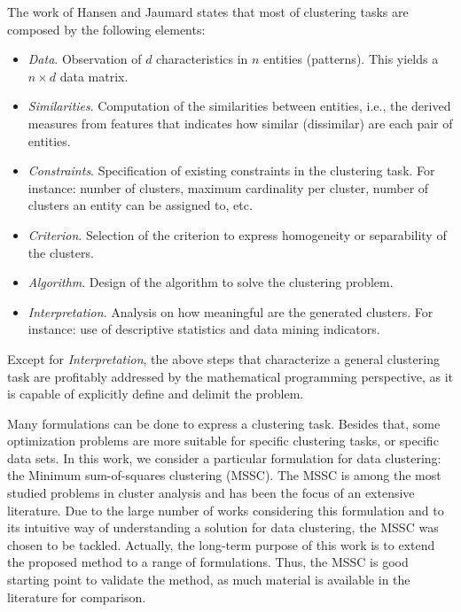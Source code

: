 The work of Hansen and Jaumard \cite{Hansen1997} states that most of clustering tasks are composed by the following elements:

\begin{itemize}

	\item \textit{Data}. Observation of $d$ characteristics in $n$ entities (patterns). This yields a $n \times d$ data matrix.

	\item \textit{Similarities}. Computation of the similarities between entities, i.e., the derived measures from features that indicates how similar (dissimilar) are each pair of entities.

	\item \textit{Constraints}. Specification of existing constraints in the clustering task. For instance: number of clusters, maximum cardinality per cluster, number of clusters an entity can be assigned to, etc.

	\item \textit{Criterion}. Selection of the criterion to express homogeneity or separability of the clusters.

	\item \textit{Algorithm}. Design of the algorithm to solve the clustering problem.

	\item \textit{Interpretation}. Analysis on how meaningful are the generated clusters. For instance: use of descriptive statistics and data mining indicators.

\end{itemize}

Except for \textit{Interpretation}, the above steps that characterize a general clustering task are profitably addressed by the mathematical programming perspective, as it is capable of explicitly define and delimit the problem.

Many formulations can be done to express a clustering task. Besides that, some optimization problems are more suitable for specific clustering tasks, or specific data sets. In this work, we consider a particular formulation for data clustering: the Minimum sum-of-squares clustering (MSSC). The MSSC is among the most studied problems in cluster analysis and has been the focus of an extensive literature. Due to the large number of works considering this formulation and to its intuitive way of understanding a solution for data clustering, the MSSC was chosen to be tackled. Actually, the long-term purpose of this work is to extend the proposed method to a range of formulations. Thus, the MSSC is good starting point to validate the method, as much material is available in the literature for comparison.

